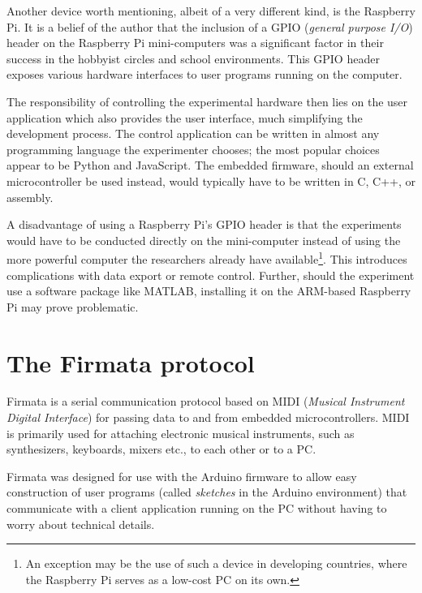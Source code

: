 
Another device worth mentioning, albeit of a very different kind, is the Raspberry Pi. It is a belief of the author that the inclusion of a GPIO (\textit{general purpose I/O}) header on the Raspberry Pi mini-computers was a significant factor in their success in the hobbyist circles and school environments. This GPIO header exposes various hardware interfaces to user programs running on the computer.

The responsibility of controlling the experimental hardware then lies on the user application which also provides the user interface, much simplifying the development process. The control application can be written in almost any programming language the experimenter chooses; the most popular choices appear to be Python and JavaScript. The embedded firmware, should an external microcontroller be used instead, would typically have to be written in C, C++, or assembly.

A disadvantage of using a Raspberry Pi's GPIO header is that the experiments would have to be conducted directly on the mini-computer instead of using the more powerful computer the researchers already have available\footnote{An exception may be the use of such a device in developing countries, where the Raspberry Pi serves as a low-cost PC on its own.}. This introduces complications with data export or remote control. Further, should the experiment use a software package like MATLAB, installing it on the ARM-based Raspberry Pi may prove problematic.

\section{The Firmata protocol}


Firmata is a serial communication protocol based on MIDI (\textit{Musical Instrument Digital Interface}) for passing data to and from embedded microcontrollers. MIDI is primarily used for attaching electronic musical instruments, such as synthesizers, keyboards, mixers etc., to each other or to a PC.

Firmata was designed for use with the Arduino firmware to allow easy construction of user programs (called \textit{sketches} in the Arduino environment) that communicate with a client application running on the PC without having to worry about technical details.

